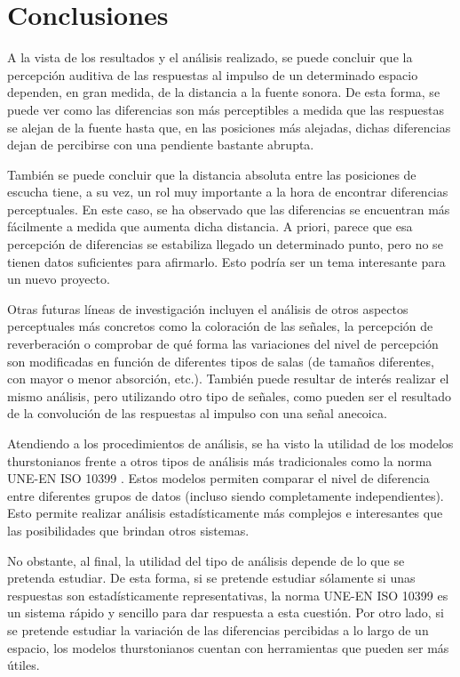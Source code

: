 \documentclass[11pt,a4paper,twoside]{book}
\author{Víctor de Tejada Molera}
\begin{document}
\chapter{Conclusiones}
    A la vista de los resultados y el análisis realizado, se puede concluir que la percepción auditiva de las respuestas al impulso de un determinado espacio dependen, en gran medida, de la distancia a la fuente sonora. De esta forma, se puede ver como las diferencias son más perceptibles a medida que las respuestas se alejan de la fuente hasta que, en las posiciones más alejadas, dichas diferencias dejan de percibirse con una pendiente bastante abrupta.
        
    También se puede concluir que la distancia absoluta entre las posiciones de escucha tiene, a su vez, un rol muy importante a la hora de encontrar diferencias perceptuales. En este caso, se ha observado que las diferencias se encuentran más fácilmente a medida que aumenta dicha distancia. A priori, parece que esa percepción de diferencias se estabiliza llegado un determinado punto, pero no se tienen datos suficientes para afirmarlo. Esto podría ser un tema interesante para un nuevo proyecto.
    
    Otras futuras líneas de investigación incluyen el análisis de otros aspectos perceptuales más concretos como la coloración de las señales, la percepción de reverberación o comprobar de qué forma las variaciones del nivel de percepción son modificadas en función de diferentes tipos de salas (de tamaños diferentes, con mayor o menor absorción, etc.). También puede resultar de interés realizar el mismo análisis, pero utilizando otro tipo de señales, como pueden ser el resultado de la convolución de las respuestas al impulso con una señal anecoica.
        
    Atendiendo a los procedimientos de análisis, se ha visto la utilidad de los modelos thurstonianos frente a otros tipos de análisis más tradicionales como la norma UNE-EN ISO 10399 \cite{ISO10399}. Estos modelos permiten comparar el nivel de diferencia entre diferentes grupos de datos (incluso siendo completamente independientes). Esto permite realizar análisis estadísticamente más complejos e interesantes que las posibilidades que brindan otros sistemas. 
    
    No obstante, al final, la utilidad del tipo de análisis depende de lo que se pretenda estudiar. De esta forma, si se pretende estudiar sólamente si unas respuestas son estadísticamente representativas, la norma UNE-EN ISO 10399 es un sistema rápido y sencillo para dar respuesta a esta cuestión. Por otro lado, si se pretende estudiar la variación de las diferencias percibidas a lo largo de un espacio, los modelos thurstonianos cuentan con herramientas que pueden ser más útiles. 
    
    
\end{document}
